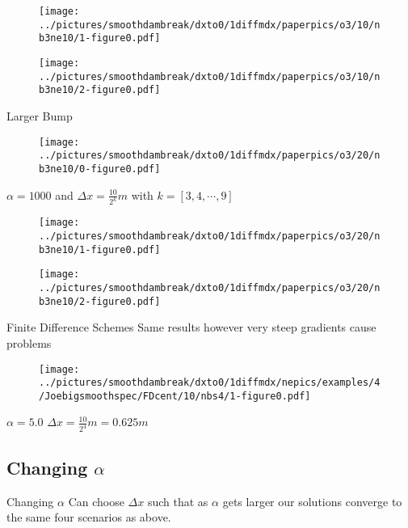 \documentclass[pdf]{beamer}
\begin{document}
\begin{frame}{}
\begin{figure}
\texttt{[image: ../pictures/smoothdambreak/dxto0/1diffmdx/paperpics/o3/10/nb3ne10/1-figure0.pdf]}
\end{figure}
\end{frame}

\begin{frame}{}
\begin{figure}
\texttt{[image: ../pictures/smoothdambreak/dxto0/1diffmdx/paperpics/o3/10/nb3ne10/2-figure0.pdf]}
\end{figure}
\end{frame}

\begin{frame}{Larger Bump}
\begin{figure}
\texttt{[image: ../pictures/smoothdambreak/dxto0/1diffmdx/paperpics/o3/20/nb3ne10/0-figure0.pdf]}
\end{figure}
$\alpha = 1000$ and $\Delta x = \frac{10}{2^k} m$ with $k = [3,4,\cdots,9]$
\end{frame}

\begin{frame}{}
\begin{figure}
\texttt{[image: ../pictures/smoothdambreak/dxto0/1diffmdx/paperpics/o3/20/nb3ne10/1-figure0.pdf]}
\end{figure}
\end{frame}

\begin{frame}{}
\begin{figure}
\texttt{[image: ../pictures/smoothdambreak/dxto0/1diffmdx/paperpics/o3/20/nb3ne10/2-figure0.pdf]}
\end{figure}
\end{frame}

\begin{frame}{Finite Difference Schemes}
Same results however very steep gradients cause problems
\begin{figure}
\texttt{[image: ../pictures/smoothdambreak/dxto0/1diffmdx/nepics/examples/4/Joebigsmoothspec/FDcent/10/nbs4/1-figure0.pdf]}
\end{figure}
$\alpha = 5.0$ $\Delta x = \frac{10}{2^4}m = 0.625m$
\end{frame}

\subsection{Changing $\alpha$}

\begin{frame}{Changing $\alpha$}
Can choose  $\Delta x$ such that as $\alpha$ gets larger our solutions converge to the same four scenarios as above.  
\end{frame}
\end{document}
